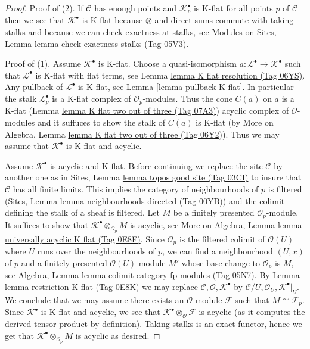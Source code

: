 \documentclass{amsart}
\theoremstyle{plain}
\theoremstyle{definition}
\theoremstyle{remark}
\numberwithin{equation}{subsection}
\begin{document}
\begin{proof}
Proof of (2). If $\mathcal{C}$ has enough points and
$\mathcal{K}_p^\bullet$ is K-flat for all points $p$ of $\mathcal{C}$
then we see that $\mathcal{K}^\bullet$ is K-flat because $\otimes$ and
direct sums commute with taking stalks and because we can check exactness
at stalks, see
Modules on Sites, Lemma \href{https://stacks.math.columbia.edu/tag/05V3}{lemma check exactness stalks (Tag 05V3)}.

\medskip\noindent
Proof of (1). Assume $\mathcal{K}^\bullet$ is K-flat.
Choose a quasi-isomorphism $a : \mathcal{L}^\bullet \to \mathcal{K}^\bullet$
such that $\mathcal{L}^\bullet$ is K-flat with flat terms, see
Lemma \href{https://stacks.math.columbia.edu/tag/06YS}{lemma K flat resolution (Tag 06YS)}. Any pullback
of $\mathcal{L}^\bullet$ is K-flat, see
Lemma \ref{lemma-pullback-K-flat}. In particular the stalk
$\mathcal{L}_p^\bullet$ is a K-flat complex of $\mathcal{O}_p$-modules.
Thus the cone $C(a)$ on $a$ is a K-flat
(Lemma \href{https://stacks.math.columbia.edu/tag/07A3}{lemma K flat two out of three (Tag 07A3)})
acyclic complex of $\mathcal{O}$-modules and it suffuces
to show the stalk of $C(a)$ is K-flat
(by More on Algebra, Lemma \href{https://stacks.math.columbia.edu/tag/06Y2}{lemma K flat two out of three (Tag 06Y2)}).
Thus we may assume that $\mathcal{K}^\bullet$ is K-flat and acyclic.

\medskip\noindent
Assume $\mathcal{K}^\bullet$ is acyclic and K-flat. Before continuing
we replace the site $\mathcal{C}$ by another one as in
Sites, Lemma \href{https://stacks.math.columbia.edu/tag/03CI}{lemma topos good site (Tag 03CI)}
to insure that $\mathcal{C}$ has all finite
limits. This implies the category of neighbourhoods of $p$ is filtered
(Sites, Lemma \href{https://stacks.math.columbia.edu/tag/00YB}{lemma neighbourhoods directed (Tag 00YB)})
and the colimit defining the stalk of a sheaf is filtered.
Let $M$ be a finitely presented $\mathcal{O}_p$-module.
It suffices to show that $\mathcal{K}^\bullet \otimes_{\mathcal{O}_p} M$
is acyclic, see
More on Algebra, Lemma \href{https://stacks.math.columbia.edu/tag/0E8F}{lemma universally acyclic K flat (Tag 0E8F)}.
Since $\mathcal{O}_p$ is the filtered colimit of $\mathcal{O}(U)$
where $U$ runs over the neighbourhoods of $p$, we
can find a neighbourhood $(U, x)$ of $p$ and a finitely
presented $\mathcal{O}(U)$-module $M'$ whose base change
to $\mathcal{O}_p$ is $M$, see
Algebra, Lemma \href{https://stacks.math.columbia.edu/tag/05N7}{lemma colimit category fp modules (Tag 05N7)}.
By Lemma \href{https://stacks.math.columbia.edu/tag/0E8K}{lemma restriction K flat (Tag 0E8K)}
we may replace $\mathcal{C}, \mathcal{O}, \mathcal{K}^\bullet$
by $\mathcal{C}/U, \mathcal{O}_U, \mathcal{K}^\bullet|_U$.
We conclude that we may assume there exists an $\mathcal{O}$-module
$\mathcal{F}$ such that $M \cong \mathcal{F}_p$.
Since $\mathcal{K}^\bullet$ is K-flat and acyclic,
we see that $\mathcal{K}^\bullet \otimes_\mathcal{O} \mathcal{F}$
is acyclic (as it computes the derived tensor product by
definition). Taking stalks is an exact functor, hence we get that
$\mathcal{K}^\bullet \otimes_{\mathcal{O}_p} M$
is acyclic as desired.
\end{proof}
\end{document}
